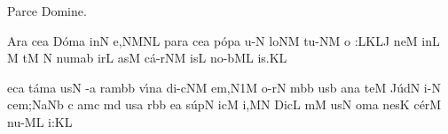\beginhymn Parce Domine.

\Internote
\nosolesmescustos
\initiumgregorianum
{}%
\sgn {}Ar\punctum a\egn
\sgn ce{}\punctum a\egn
\spatium
\sgn D{\'o}m\punctum a\egn
\sgn {}in\punctum N\egn
\sgn {}e,\clivis NM\augmentumduplex NL\egn
\spatium
\divisiominima
\spatium
\sgn p{a}r\punctum a\egn
\sgn ce{}\punctum a\egn
\spatium
\sgn p{\'o}p\punctum a\egn
\sgn {}u-\punctum N\egn
\sgn lo{}\clivis NM\egn
\spatium
\sgn tu-\clivis NM\egn
\sgn {}o{ :}\clivis LK\augmentumduplex LJ\egn
\spatium
\divisiominor
\spatium
\sgn ne{}\punctum M\egn
\spatium
\sgn {}in\punctum L\egn
\spatium
\custos M
\lineaproxima
\sgn {}{\ae}t\punctum M\egn
{}\punctum N\egn
\sgn num\punctum a\augmentum b\egn
\spatium
\sgn {}ir\punctum L\egn
\sgn {}as\punctum M\egn
\sgn c{\'a}{-r}\clivis NM\egn
\sgn {}is\punctum L\egn
\spatium
\sgn n{o}{-b}\clivis ML\egn
\sgn {}i{s.}\punctum K\augmentum L\egn
\Finisgregoriana

\bigskip

\initiumgregorianum
{}%
ec\punctum a\egn
\sgn t{\'a}m\punctum a\egn
\sgn {}us\punctum N\egn
\spatium
{}-\punctum a\egn
\sgn ram\bmolle b\punctum b\egn
\spatium
\sgn v{\'\i}n\punctum a\egn
\sgn di{-c}\clivis NM\egn
\sgn {}e{m,}\episem N1\punctum M\egn
\spatium
\divisiominima
\spatium
{}o{-r}\punctum N\egn
{}m\bmolle b\punctum b\egn
\sgn {}us\punctum b\egn
\spatium
\sgn {}an\punctum a\egn
\sgn te{}\punctum M\egn
\spatium
\sgn J{\'u}d\punctum N\egn
\sgn {}i-\punctum N\egn
\sgn ce{m;}\pes Na\augmentumduplex Nb\egn
\spatium
\divisiominor
\spatium
\custos c
\lineaproxima
{}am\punctum c\egn
{}m\punctum d\egn
\sgn {}us\punctum a\egn
\spatium
{}r\engl{ }\bmolle b\punctum b\egn
\sgn {}e{}\punctum a\egn
\spatium
\sgn s{\'u}p\punctum N\egn
{}ic\punctum M\egn
\sgn {}i,\punctum M\augmentum N\egn
\spatium
\divisiominima
\spatium
\sgn Dic\punctum L\egn
{}m\punctum M\egn
\sgn {}us\punctum N\egn
\spatium
\sgn { }om\punctum a\egn
\sgn nes\punctum K\egn
\spatium
\sgn c{\'e}r\punctum M\egn
\sgn nu-\clivis ML\egn
\sgn {}i:\punctum K\augmentum L\egn
\spatium
\Finisgregoriana

\bigskip

